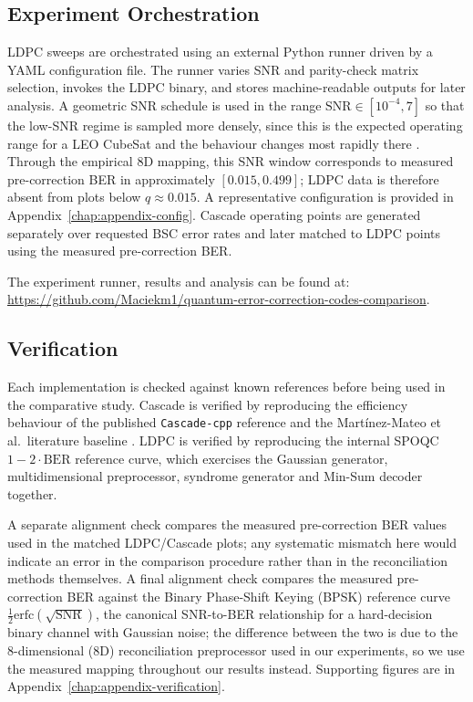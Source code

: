 \documentclass{UoYCSproject}
\begin{document}
\subsection{Experiment Orchestration}
\label{subsec:meth-orchestration}

LDPC sweeps are orchestrated using an external Python runner driven by a
YAML configuration file. The runner varies SNR and parity-check matrix
selection, invokes the LDPC binary, and stores machine-readable outputs for
later analysis. A geometric SNR schedule is used in the range
$\mathrm{SNR} \in [10^{-4}, 7]$ so that the low-SNR regime is sampled more
densely, since this is the expected operating range for a LEO CubeSat and
the behaviour changes most rapidly there \cite{milicevic_quasi-cyclic_2018}.
Through the empirical 8D mapping, this SNR window corresponds to measured
pre-correction BER in approximately $[0.015, 0.499]$; LDPC data is therefore
absent from plots below $q \approx 0.015$. A representative configuration
is provided in Appendix~\ref{chap:appendix-config}. Cascade operating points
are generated separately over requested BSC error rates and later matched
to LDPC points using the measured pre-correction BER.

The experiment runner, results and analysis can be found at: \url{https://github.com/Maciekm1/quantum-error-correction-codes-comparison}.

\subsection{Verification}
\label{subsec:meth-verification}

Each implementation is checked against known references before being used in
the comparative study. Cascade is verified by reproducing the efficiency
behaviour of the published \texttt{Cascade-cpp} reference and the
Mart\'inez-Mateo et al.\ literature baseline
\cite{martinez-mateo_demystifying_2015, mueller_performance_2025}. LDPC is
verified by reproducing the internal SPOQC $1 - 2\cdot\mathrm{BER}$ reference
curve, which exercises the Gaussian generator, multidimensional
preprocessor, syndrome generator and Min-Sum decoder together.


A separate alignment check compares the measured pre-correction BER values
used in the matched LDPC/Cascade plots; any systematic mismatch here would
indicate an error in the comparison procedure rather than in the
reconciliation methods themselves. A final alignment check compares the
measured pre-correction BER against the Binary Phase-Shift Keying (BPSK)
reference curve $\tfrac{1}{2}\mathrm{erfc}(\sqrt{\mathrm{SNR}})$, the
canonical SNR-to-BER relationship for a hard-decision binary channel with
Gaussian noise; the difference between the two is due to the 8-dimensional
(8D) reconciliation preprocessor used in our experiments,
so we use the measured mapping throughout our results instead. Supporting figures
are in Appendix~\ref{chap:appendix-verification}.
\end{document}
